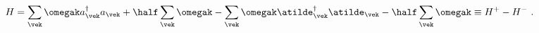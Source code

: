 \begin{equation}
 H = \sum_{\vek}  \omegak a^\dagger_{\vek}a_{\vek}
   +\half \sum_{\vek}\omegak
   - \sum_{\vek} \omegak \atilde^\dagger_{\vek}\atilde_{\vek}
   -\half \sum_{\vek}\omegak \equiv H^+ - H^- \ .
\end{equation}

